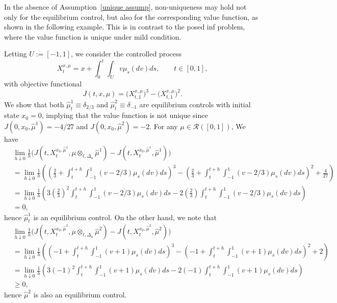 \documentclass[12pt]{article}
\theoremstyle{named}
\numberwithin{equation}{section}
\begin{document}
\noindent
In the absence of Assumption~\ref{unique assump},
non-uniqueness may hold not only for
the equilibrium control,
but also for the corresponding value function,
as shown in the following example.
This is in contrast to the posed inf problem,
where the value function is unique
under mild condition.

\medskip
\noindent
Letting $U := [-1, 1]$,
we consider the controlled process
$$
  X^{x,\mu}_t = x + \int_0^t \int_U v \mu_s(dv) ds, \qquad t \in [0,1],
$$
with objective functional
\[
    J(t, x, \mu) = \big(X^{x,\mu}_{t,1}\big)^3 - \big(X^{x,\mu}_{t,1}\big)^2.
\]
We show that both $\hat{\mu}^1_t \equiv \delta_{2/3} $
and $\hat{\mu}^2_t \equiv \delta_{-1}$
are equilibrium controls with initial state $x_0 = 0$,
implying that the value function is not unique
since $J(0, x_0, \hat{\mu}^1) = -4/27$
and $J(0, x_0, \hat{\mu}^2) = -2$.
For any $\mu \in \mathcal{R}( [0,1] )$,
We have
\begin{align*}
  &\lim\limits_{h \downarrow 0}
  \frac{1}{h} \big(
J(t, X^{x_0,\hat{\mu}^1}_t, \mu \otimes_{t,\Delta_n} \hat{\mu}^1) - J(t, X^{x_0,\hat{\mu}^1}_t, \hat{\mu}^1)
\big) \\
& = \lim\limits_{h \downarrow 0}
\frac{1}{h} \left(
\left(\frac{2}{3} + \int_t^{t+h}\int_{-1}^1 (v-2/3) \mu_s(dv)ds\right)^3 -
\left(\frac{2}{3} + \int_t^{t+h}\int_{-1}^1 (v-2/3) \mu_s(dv)ds\right)^2 + \frac{4}{27}
\right)
\\
& = \lim\limits_{h \downarrow 0}
\frac{1}{h} \left(
3 \left(\frac{2}{3}\right)^2
    \int_t^{t+h}\int_{-1}^1 (v-2/3) \mu_s(dv)ds
- 2 \left(\frac{2}{3}\right)
    \int_t^{t+h}\int_{-1}^1 (v-2/3) \mu_s(dv)ds
\right)
\\
& =0,
\end{align*}
hence $\hat{\mu}^1_t$ is an equilibrium control.
On the other hand, we note that
\begin{align*}
  &\lim\limits_{h \downarrow 0}
  \frac{1}{h} \big(
J(t, X^{x_0,\hat{\mu}^2}_t, \mu \otimes_{t,\Delta_n} \hat{\mu}^2) - J(t, X^{x_0,\hat{\mu}^2}_t, \hat{\mu}^2)
\big) \\
& =
\lim\limits_{h \downarrow 0}
\frac{1}{h} \left(
\left(-1 + \int_t^{t+h}\int_{-1}^1 (v+1) \mu_s(dv)ds\right)^3 - \left(-1 + \int_t^{t+h}\int_{-1}^1 (v+1) \mu_s(dv)ds\right)^2 + 2
\right) \\
& =
\lim\limits_{h \downarrow 0}
\frac{1}{h} \left(
3 (-1)^2 \int_t^{t+h}\int_{-1}^1 (v+1) \mu_s(dv)ds
- 2 (-1) \int_t^{t+h}\int_{-1}^1 (v+1) \mu_s(dv)ds
\right) \\
& \geq  0,
\end{align*}
 hence
$\hat{\mu}^2$ is also an equilibrium control.
\end{document}

